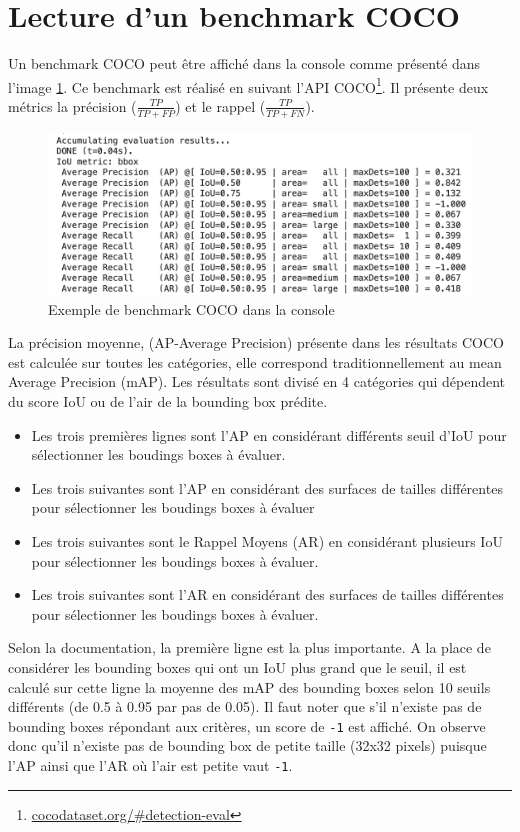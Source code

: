 \section{Lecture d'un benchmark COCO}
Un benchmark COCO peut être affiché dans la console comme présenté dans l'image \ref{fig:eval_coco_benchmark}. Ce benchmark est réalisé en suivant l'API COCO\footnote[1]{\url{cocodataset.org/\#detection-eval}}. Il présente deux métrics la précision ($\displaystyle{\frac{TP}{TP+FP} }$) et le rappel ($\displaystyle{ \frac{TP}{TP+FN}}$).
\begin{figure}[h!]
    \centering
    \includegraphics[width=\textwidth]{images/eval_coco_benchmark_white.png}
    \caption{Exemple de benchmark COCO dans la console}
    \label{fig:eval_coco_benchmark}
\end{figure}
La précision moyenne, (AP-Average Precision) présente dans les résultats COCO est calculée sur toutes les catégories, elle correspond traditionnellement au mean Average Precision (mAP).
Les résultats sont divisé en 4 catégories qui dépendent du score IoU ou de l'air de la bounding box prédite.
\begin{itemize}
    \item Les trois premières lignes sont l'AP en considérant différents seuil d'IoU pour sélectionner les boudings boxes à évaluer.
    \item Les trois suivantes sont l'AP en considérant des surfaces de tailles différentes pour sélectionner les boudings boxes à évaluer
    \item Les trois suivantes sont le Rappel Moyens (AR) en considérant plusieurs IoU pour sélectionner les boudings boxes à évaluer.
    \item Les trois suivantes sont l'AR en considérant des surfaces de tailles différentes pour sélectionner les boudings boxes à évaluer.
\end{itemize}
Selon la documentation, la première ligne est la plus importante. A la place de considérer les bounding boxes qui ont un IoU plus grand que le seuil, il est calculé sur cette ligne la moyenne des mAP des bounding boxes selon 10 seuils différents (de 0.5 à 0.95 par pas de 0.05).
Il faut noter que s'il n'existe pas de bounding boxes répondant aux critères, un score de \verb|-1| est affiché. On observe donc qu'il n'existe pas de bounding box de petite taille (32x32 pixels) puisque l'AP ainsi que l'AR où l'air est petite vaut \verb|-1|.
